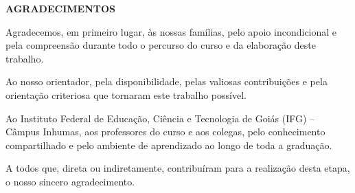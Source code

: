 \begin{titlepage}
	\begin{center}
		{\bfseries\Large AGRADECIMENTOS} %
		\vspace{2cm} %
	\end{center}
	
	\noindent
Agradecemos, em primeiro lugar, às nossas famílias, pelo apoio
incondicional e pela compreensão durante todo o percurso do curso e da
elaboração deste trabalho.

Ao nosso orientador, pela disponibilidade, pelas valiosas contribuições
e pela orientação criteriosa que tornaram este trabalho possível.

Ao Instituto Federal de Educação, Ciência e Tecnologia de Goiás (IFG) --
Câmpus Inhumas, aos professores do curso e aos colegas, pelo
conhecimento compartilhado e pelo ambiente de aprendizado ao longo de
toda a graduação.

A todos que, direta ou indiretamente, contribuíram para a realização
desta etapa, o nosso sincero agradecimento.
\newline
\newline

	\vspace{2cm} %
\end{titlepage}

